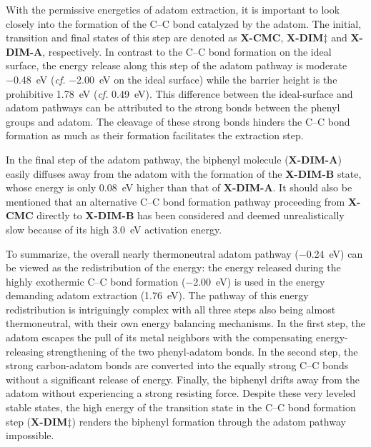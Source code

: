 \documentclass[journal=jacsat,manuscript=article]{achemso}
\newcommand{\comm}{\color{ForestGreen}} %
\newcommand{\sinfo}{Supplementary Information}
\begin{document}
{With the permissive energetics of adatom extraction, it is important to look closely into the formation of the C--C bond catalyzed by the adatom. 
The initial, transition and final states of this step are denoted as \textbf{X-CMC}, \textbf{X-DIM$\ddagger$} and \textbf{X-DIM-A}, respectively.
In contrast to the C--C bond formation on the ideal surface, the energy release along this step of the adatom pathway is moderate \SI{-0.48}{\electronvolt} (\textit{cf.} \SI{-2.00}{\electronvolt} on the ideal surface) while the barrier height is the prohibitive \SI{1.78}{\electronvolt} (\textit{cf.} \SI{0.49}{\electronvolt}). 
This difference between the ideal-surface and adatom pathways can be attributed to the strong bonds between the phenyl groups and adatom.
The cleavage of these strong bonds hinders the C--C bond formation as much as their formation facilitates the extraction step. %

In the final step of the adatom pathway, the biphenyl molecule (\textbf{X-DIM-A}) easily diffuses away from the adatom with the formation of the \textbf{X-DIM-B} state, whose energy is only \SI{0.08}{\electronvolt} higher than that of \textbf{X-DIM-A}. It should also be mentioned that an alternative C--C bond formation pathway proceeding from \textbf{X-CMC} directly to \textbf{X-DIM-B} has been considered and deemed unrealistically slow because of its high \SI{3.0}{\electronvolt} activation energy.

To summarize, the overall nearly thermoneutral adatom pathway (\SI{-0.24}{\electronvolt}) can be viewed as the redistribution of the energy: the energy released during the highly exothermic C--C bond formation (\SI{-2.00}{\electronvolt}) is used in the energy demanding adatom extraction (\SI{1.76}{\electronvolt}). The pathway of this energy redistribution is intriguingly complex with all three steps also being almost thermoneutral, with their own energy balancing mechanisms. %
In the first step, the adatom escapes the pull of its metal neighbors with the compensating energy-releasing strengthening of the two phenyl-adatom bonds. In the second step, the strong carbon-adatom bonds are converted into the equally strong C--C bonds without a significant release of energy. Finally, the biphenyl drifts away from the adatom without experiencing a strong resisting force. Despite these very leveled stable states, the high energy of the transition state in the C--C bond formation step (\textbf{X-DIM$\ddagger$}) renders the biphenyl formation through the adatom pathway impossible.

}
\end{document}
